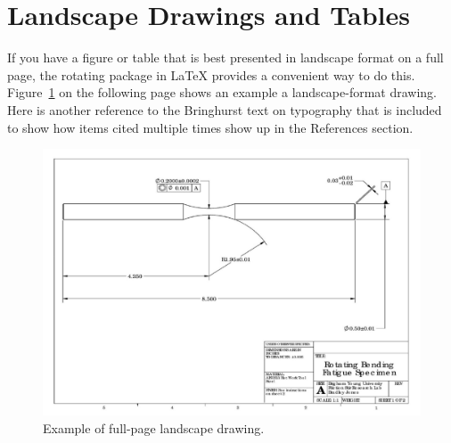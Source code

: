 \section{Landscape Drawings and Tables}
If you have a figure\cite{bugref1} or table that is best presented in landscape format on a full page, the {\ttfamily rotating} package in \LaTeX{} provides a convenient way to do this. Figure~\ref{fig:landscape_dwg} on the following page shows an example a landscape-format drawing. Here is another reference to the Bringhurst text on typography that is included to show how items cited multiple times show up in the References section.
\begin{figure}
	\centering
	\vspace{1.7in} %
	\includegraphics[width=1.0\textwidth]{figures/part_dwg_landscape.pdf}
	\caption{Example of full-page landscape drawing.}
	\label{fig:landscape_dwg}	
\end{figure}


